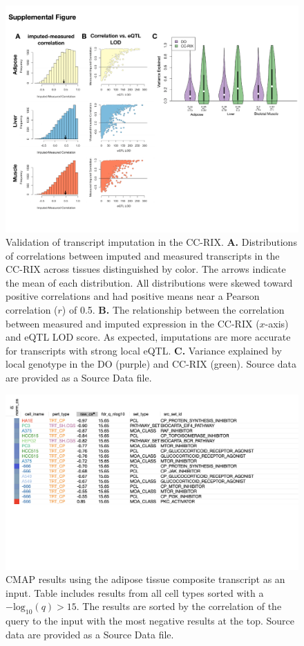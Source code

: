 \documentclass[
]{article}
\begin{document}
\begin{figure}[ht!]
\includegraphics[width=\textwidth]{Figures/Supp_Fig_CC-RIX_Imputation.pdf} 
\caption{Validation of transcript imputation in the CC-RIX. 
\textbf{A.} Distributions of correlations between imputed and 
measured transcripts in the CC-RIX across tissues distinguished
by color. The arrows indicate the mean of each distribution. All 
distributions were skewed toward positive correlations and had 
positive means near a Pearson correlation ($r$) of 0.5. 
\textbf{B.} The relationship between the correlation between 
measured and imputed expression in the CC-RIX ($x$-axis) 
and eQTL LOD score. As expected, imputations are more
accurate for transcripts with strong local eQTL. \textbf{C.} 
Variance explained by local genotype in the DO (purple) and 
CC-RIX (green). Source data are provided as a Source Data file.
}
\label{fig:cc_imputation}
\end{figure}

\begin{figure}[ht!]
\includegraphics[width=\textwidth]{Figures/Supp_Fig_Adipose_all_cell_types.png} 
\caption{CMAP results using the adipose tissue composite transcript as 
an input. Table includes results from all cell types sorted with a 
$-\mathrm{log}_{10}(q) > 15$. The results are sorted by the correlation of the 
query to the input with the most negative results at the top. Source 
data are provided as a Source Data file.
}
\label{fig:clue_adipose_all}
\end{figure}
\end{document}
